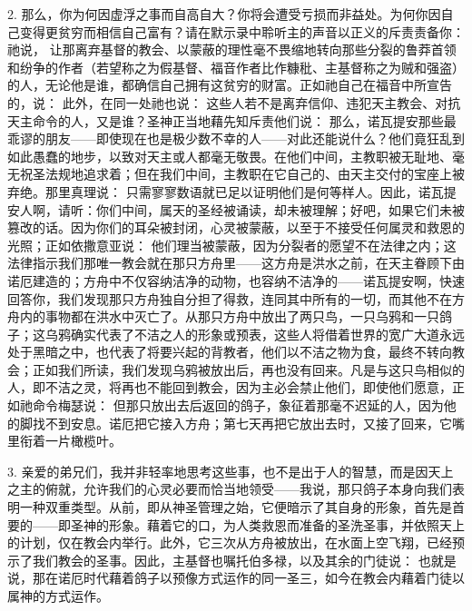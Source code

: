 2. 那么，你为何因虚浮之事而自高自大？你将会遭受亏损而非益处。为何你因自己变得更贫穷而相信自己富有？请在默示录中聆听主的声音以正义的斥责责备你：祂说，  让那离弃基督的教会、以蒙蔽的理性毫不畏缩地转向那些分裂的鲁莽首领和纷争的作者（若望称之为假基督、福音作者比作糠秕、主基督称之为贼和强盗）的人，无论他是谁，都确信自己拥有这贫穷的财富。正如祂自己在福音中所宣告的，说：  此外，在同一处祂也说：  这些人若不是离弃信仰、违犯天主教会、对抗天主命令的人，又是谁？圣神正当地藉先知斥责他们说：  那么，诺瓦提安那些最乖谬的朋友——即使现在也是极少数不幸的人——对此还能说什么？他们竟狂乱到如此愚蠢的地步，以致对天主或人都毫无敬畏。在他们中间，主教职被无耻地、毫无祝圣法规地追求着；但在我们中间，主教职在它自己的、由天主交付的宝座上被弃绝。那里真理说：  只需寥寥数语就已足以证明他们是何等样人。因此，诺瓦提安人啊，请听：你们中间，属天的圣经被诵读，却未被理解；好吧，如果它们未被篡改的话。因为你们的耳朵被封闭，心灵被蒙蔽，以至于不接受任何属灵和救恩的光照；正如依撒意亚说：  他们理当被蒙蔽，因为分裂者的愿望不在法律之内；这法律指示我们那唯一教会就在那只方舟里——这方舟是洪水之前，在天主眷顾下由诺厄建造的；方舟中不仅容纳洁净的动物，也容纳不洁净的——诺瓦提安啊，快速回答你，我们发现那只方舟独自分担了得救，连同其中所有的一切，而其他不在方舟内的事物都在洪水中灭亡了。从那只方舟中放出了两只鸟，一只乌鸦和一只鸽子；这乌鸦确实代表了不洁之人的形象或预表，这些人将借着世界的宽广大道永远处于黑暗之中，也代表了将要兴起的背教者，他们以不洁之物为食，最终不转向教会；正如我们所读，我们发现乌鸦被放出后，再也没有回来。凡是与这只鸟相似的人，即不洁之灵，将再也不能回到教会，因为主必会禁止他们，即使他们愿意，正如祂命令梅瑟说：  但那只放出去后返回的鸽子，象征着那毫不迟延的人，因为他的脚找不到安息。诺厄把它接入方舟；第七天再把它放出去时，又接了回来，它嘴里衔着一片橄榄叶。\par

3. 亲爱的弟兄们，我并非轻率地思考这些事，也不是出于人的智慧，而是因天上之主的俯就，允许我们的心灵必要而恰当地领受——我说，那只鸽子本身向我们表明一种双重类型。从前，即从神圣管理之始，它便暗示了其自身的形象，首先是首要的——即圣神的形象。藉着它的口，为人类救恩而准备的圣洗圣事，并依照天上的计划，仅在教会内举行。此外，它三次从方舟被放出，在水面上空飞翔，已经预示了我们教会的圣事。因此，主基督也嘱托伯多禄，以及其余的门徒说： 也就是说，那在诺厄时代藉着鸽子以预像方式运作的同一圣三，如今在教会内藉着门徒以属神的方式运作。\par

